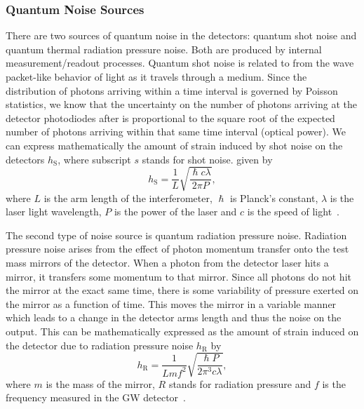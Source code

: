 \subsubsection{Quantum Noise Sources}
%
%
There are two sources of quantum noise in the detectors: 
quantum shot noise and quantum thermal radiation pressure 
noise. Both are produced by internal measurement/readout processes.
Quantum shot noise is related to 
from the wave packet-like
behavior of light as it travels through a medium. Since
the distribution of photons arriving within 
a time interval is governed by Poisson statistics,  
we know that the uncertainty on the 
number of photons arriving at the detector 
photodiodes after is proportional to the 
square root of the expected number of photons 
arriving within that same time interval (optical power). 
We can express mathematically the amount of strain induced by shot noise on 
the detectors $h_{\mathrm{S}}$, where subscript $s$ stands for shot noise. 
given by 
%
\begin{equation}
    h_{\mathrm{S}} = \frac{1}{L} \sqrt{\frac{\hslash c \lambda}{2\pi P}},
\end{equation}
%
where $L$ is the arm length of the interferometer, $\hslash$ is 
Planck's constant, $\lambda$ is the laser light wavelength, 
$P$ is the power of the laser and $c$ is the speed of
light~\cite{Hild2014}.

%
%
The second type of noise source is quantum radiation pressure noise. Radiation pressure noise arises from the effect of photon momentum transfer onto the test mass mirrors of the detector. When a photon from the detector laser hits a mirror, it transfers some momentum to that mirror. Since all photons do not hit the mirror at the exact same time, there is some variability of pressure exerted on the mirror as a function of time. This moves the mirror in a 
variable manner which leads to a change in the detector arms length and 
thus the noise on the output. This can be mathematically expressed as 
the amount of strain induced on the detector due to radiation pressure 
noise $h_{\mathrm{R}}$ by 
%
\begin{equation}
    h_{\mathrm{R}} = \frac{1}{Lmf^2}  \sqrt{\frac{\hslash P}{2\pi^3 c\lambda}},
\end{equation}
%
where $m$ is the mass of the mirror, $R$ stands for radiation pressure and $f$ is the frequency measured in the \ac{GW} detector~\cite{Hild2014}. 

